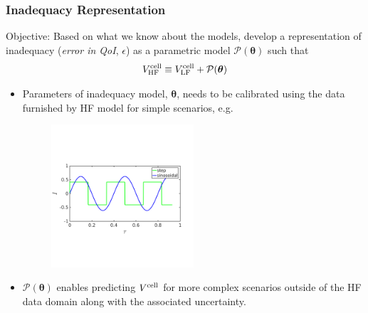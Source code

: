 \documentclass[10pt,xcolor=dvipsnames,compress]{beamer}
\begin{document}
\begin{frame}
\frametitle{Inadequacy Representation}
\vfill


\begin{alertblock}{Objective:}
Based on what we know about the models, develop a representation of inadequacy (\textit{error in QoI}, $\epsilon$) as a parametric model $\mathcal{P}(\boldsymbol{\theta})$ such that 
\begin{equation*}
V^{\rm cell}_{\rm HF} \equiv  V^{\rm cell}_{\rm LF} + \mathcal{P}(\boldsymbol{\theta})
\end{equation*}
\end{alertblock}


\begin{itemize}

\item Parameters of inadequacy model, $\boldsymbol{\theta}$, needs to be calibrated using the data furnished by HF model for simple scenarios, e.g. 

\begin{figure}[h]
    \centering
    \includegraphics[trim = 0.in 2.4in 0.8in 2.8in, clip, width=0.5\textwidth]{figs/I_scenario.png} 
\end{figure}

\vspace{-0.1in}

\item $\mathcal{P}(\boldsymbol{\theta})$ enables predicting $V^{\rm cell}$ for more complex scenarios outside of the HF data domain along with the associated uncertainty.

\end{itemize}


\vfill
\end{frame}
\end{document}
